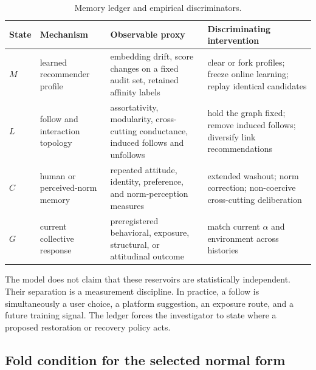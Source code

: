 \documentclass[10pt,a4paper]{article}
\begin{document}
\begin{table}[!htbp]
\centering
\caption{Memory ledger and empirical discriminators.}
\label{tab:ledger}
\small
\begin{tabularx}{\textwidth}{|p{1.0cm}|p{3.0cm}|Y|Y|}
\hline
\textbf{State} & \textbf{Mechanism} & \textbf{Observable proxy} & \textbf{Discriminating intervention}\\
\hline
$M$ & learned recommender profile & embedding drift, score changes on a fixed audit set, retained affinity labels & clear or fork profiles; freeze online learning; replay identical candidates\\
\hline
$L$ & follow and interaction topology & assortativity, modularity, cross-cutting conductance, induced follows and unfollows & hold the graph fixed; remove induced follows; diversify link recommendations\\
\hline
$C$ & human or perceived-norm memory & repeated attitude, identity, preference, and norm-perception measures & extended washout; norm correction; non-coercive cross-cutting deliberation\\
\hline
$G$ & current collective response & preregistered behavioral, exposure, structural, or attitudinal outcome & match current $\alpha$ and environment across histories\\
\hline
\end{tabularx}
\end{table}

The model does not claim that these reservoirs are statistically independent. Their separation is a measurement discipline. In practice, a follow is simultaneously a user choice, a platform suggestion, an exposure route, and a future training signal. The ledger forces the investigator to state where a proposed restoration or recovery policy acts.

\subsection{Fold condition for the selected normal form}
\end{document}
